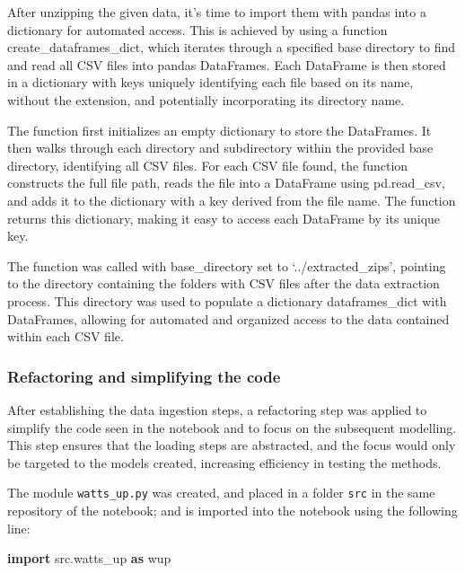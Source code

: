 \documentclass[
]{article}
\newenvironment{Shaded}{}{}
\newcommand{\ImportTok}[1]{\textcolor[rgb]{0.00,0.50,0.00}{\textbf{#1}}}
\newcommand{\NormalTok}[1]{#1}
\begin{document}
After unzipping the given data, it's time to import them with pandas
into a dictionary for automated access. This is achieved by using a
function create\_dataframes\_dict, which iterates through a specified
base directory to find and read all CSV files into pandas DataFrames.
Each DataFrame is then stored in a dictionary with keys uniquely
identifying each file based on its name, without the extension, and
potentially incorporating its directory name.

The function first initializes an empty dictionary to store the
DataFrames. It then walks through each directory and subdirectory within
the provided base directory, identifying all CSV files. For each CSV
file found, the function constructs the full file path, reads the file
into a DataFrame using pd.read\_csv, and adds it to the dictionary with
a key derived from the file name. The function returns this dictionary,
making it easy to access each DataFrame by its unique key.

The function was called with base\_directory set to
`../extracted\_zips', pointing to the directory containing the folders
with CSV files after the data extraction process. This directory was
used to populate a dictionary dataframes\_dict with DataFrames, allowing
for automated and organized access to the data contained within each CSV
file.

\subsubsection{Refactoring and simplifying the
code}\label{refactoring-and-simplifying-the-code}

After establishing the data ingestion steps, a refactoring step was
applied to simplify the code seen in the notebook and to focus on the
subsequent modelling. This step ensures that the loading steps are
abstracted, and the focus would only be targeted to the models created,
increasing efficiency in testing the methods.

The module \texttt{watts\_up.py} was created, and placed in a folder
\texttt{src} in the same repository of the notebook; and is imported
into the notebook using the following line:

\begin{Shaded}
\begin{Highlighting}[]
\ImportTok{import}\NormalTok{ src.watts\_up }\ImportTok{as}\NormalTok{ wup}
\end{Highlighting}
\end{Shaded}
\end{document}

